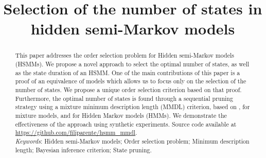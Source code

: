 \documentclass[extendedabs]{recpad2k}
\title{Selection of the number of states in hidden semi-Markov models}
\begin{document}
\maketitle

\begin{abstract}
This paper addresses the order selection problem for Hidden semi-Markov models (HSMMs). We propose a novel approach to select the optimal number of states, as well as the state duration of an HSMM. One of the main contributions of this paper is a proof of an equivalence of models which allows us to focus only on the selection of the number of states. We propose a unique order selection criterion based on that proof. %
Furthermore, the optimal number of states is found through a sequential pruning strategy using a mixture minimum description length (MMDL) criterion, based on \citet{figueiredo1999fitting}, for mixture models, and \citet{bicego2003sequential} for Hidden Markov models (HMMs). We demonstrate the effectiveness of the approach using synthetic experiments. Source code available at \url{https://github.com/filiparente/hsmm_mmdl}.\\ \noindent
\textit{Keywords}: Hidden semi-Markov models; Order selection problem; Minimum description length; Bayesian inference criterion; State pruning.
\end{abstract}
\vspace*{-3pt}
\end{document}
